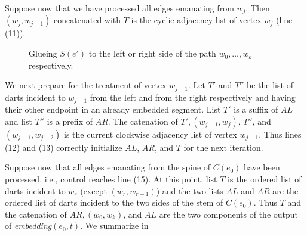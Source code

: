 Suppose now that we have processed all edges emanating from $w_j$.
Then $(w_j,w_{j-1})$ concatenated with $T$ is the cyclic adjacency list
of vertex $w_j$ (line (11)).

\begin{figure}[htb]
\begin{center}

\end{center}
\caption{\label{glueing}
Glueing $S(e')$ to the left or right side of the path
$w_0,\ldots ,w_k$ respectively.}
\end{figure}

We next prepare for the treatment of vertex $w_{j-1}$.
Let $T'$ and $T''$ be the list of darts incident to $w_{j-1}$ from
the left and from the right respectively and having their other
endpoint in an already embedded segment.
List $T'$ is a suffix of $AL$ and list $T''$ is a prefix of $AR$.
The catenation of $T',(w_{j-1},w_j)$, $T''$, and
$(w_{j-1},w_{j-2})$ is the current clockwise adjacency list of
vertex $w_{j-1}$.
Thus lines (12) and (13) correctly initialize $AL$, $AR$, and $T$ for
the next iteration.

Suppose now that all edges emanating from the spine of $C(e_0)$ have
been processed, i.e., control reaches line (15).
At this point, list $T$ is the ordered list of darts incident to $w_r$
(except $(w_r,w_{r-1})$) and the two lists $AL$ and $AR$ are the
ordered list of darts incident to the two sides of the stem of $C(e_0)$.
Thus $T$ and the catenation of $AR,(w_0,w_k)$, and
$AL$ are the two components of the output of {\em embedding}$(e_0,t)$.
We summarize in

